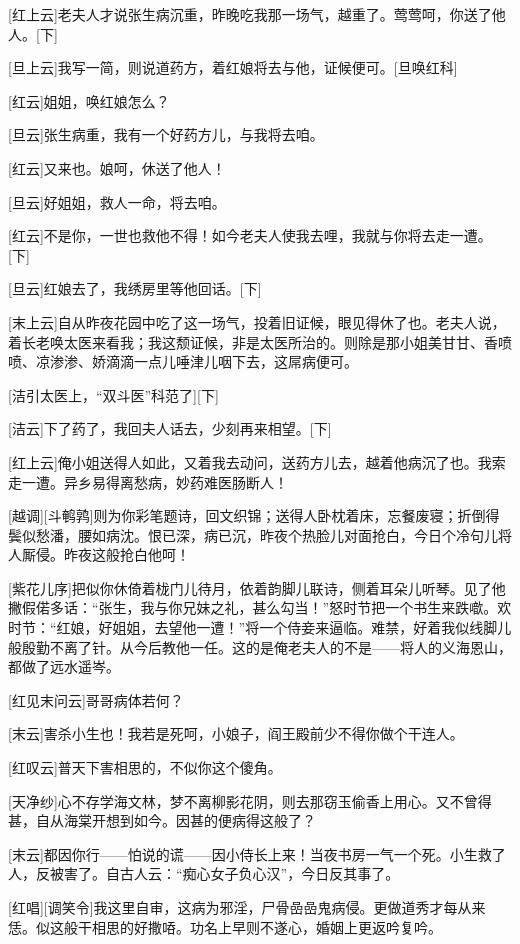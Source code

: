 \documentclass{book}
\begin{document}
[红上云]老夫人才说张生病沉重，昨晚吃我那一场气，越重了。莺莺呵，你送了他人。[下]

[旦上云]我写一简，则说道药方，着红娘将去与他，证候便可。[旦唤红科]

[红云]姐姐，唤红娘怎么？

[旦云]张生病重，我有一个好药方儿，与我将去咱。

[红云]又来也。娘呵，休送了他人！

[旦云]好姐姐，救人一命，将去咱。

[红云]不是你，一世也救他不得！如今老夫人使我去哩，我就与你将去走一遭。[下]

[旦云]红娘去了，我绣房里等他回话。[下]

[末上云]自从昨夜花园中吃了这一场气，投着旧证候，眼见得休了也。老夫人说，着长老唤太医来看我；我这颓证候，非是太医所治的。则除是那小姐美甘甘、香喷喷、凉渗渗、娇滴滴一点儿唾津儿咽下去，这屌病便可。

[洁引太医上，``双斗医''科范了][下]

[洁云]下了药了，我回夫人话去，少刻再来相望。[下]

[红上云]俺小姐送得人如此，又着我去动问，送药方儿去，越着他病沉了也。我索走一遭。异乡易得离愁病，妙药难医肠断人！

[越调][斗鹌鹑]则为你彩笔题诗，回文织锦；送得人卧枕着床，忘餐废寝；折倒得鬓似愁潘，腰如病沈。恨已深，病已沉，昨夜个热脸儿对面抢白，今日个冷句儿将人厮侵。昨夜这般抢白他呵！

[紫花儿序]把似你休倚着栊门儿待月，依着韵脚儿联诗，侧着耳朵儿听琴。见了他撇假偌多话：``张生，我与你兄妹之礼，甚么勾当！''怒时节把一个书生来跌噷。欢时节：``红娘，好姐姐，去望他一遭！''将一个侍妾来逼临。难禁，好着我似线脚儿般殷勤不离了针。从今后教他一任。这的是俺老夫人的不是——将人的义海恩山，都做了远水遥岑。

[红见末问云]哥哥病体若何？

[末云]害杀小生也！我若是死呵，小娘子，阎王殿前少不得你做个干连人。

[红叹云]普天下害相思的，不似你这个傻角。

[天净纱]心不存学海文林，梦不离柳影花阴，则去那窃玉偷香上用心。又不曾得甚，自从海棠开想到如今。因甚的便病得这般了？

[末云]都因你行——怕说的谎——因小侍长上来！当夜书房一气一个死。小生救了人，反被害了。自古人云：``痴心女子负心汉''，今日反其事了。

[红唱][调笑令]我这里自审，这病为邪淫，尸骨嵒嵒鬼病侵。更做道秀才每从来恁。似这般干相思的好撒㖔。功名上早则不遂心，婚姻上更返吟复吟。
\end{document}
